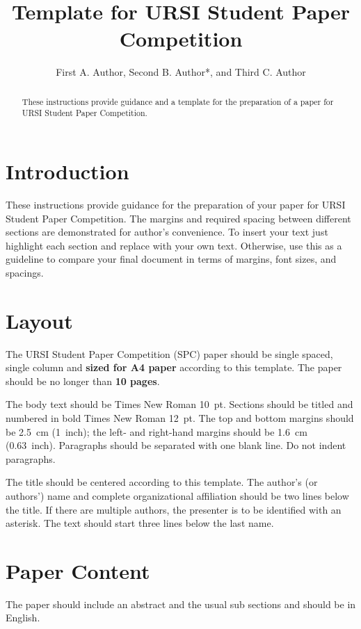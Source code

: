 \documentclass[spc]{ursi}
\title{Template for URSI Student Paper Competition}
\author{First A. Author\affref{ref1}, Second B. Author*\affref{ref1},
  and Third C. Author\affref{ref2}}
\affiliation{%
  \aff{ref1}{ABC University, Prague, Czechia; e-mail: FAA@seznam.cz; SBA@email.cz}
  \aff{ref2}{The Next University, Neverland, USA; e-mail: TCA@gmail.com}
}
\begin{document}
\maketitle

\begin{abstract}
  These instructions provide guidance and a template for
  the preparation of a paper for URSI Student Paper Competition.
\end{abstract}

\section{Introduction}

These instructions provide guidance for the preparation of your paper for URSI Student Paper Competition. The margins and required spacing between different
sections are demonstrated for author's convenience. To insert your text
just highlight each section and replace with your own text. Otherwise, use
this as a guideline to compare your final document in terms of margins,
font sizes, and spacings.

\section{Layout}

The URSI Student Paper Competition (SPC) paper should be single spaced,
single column and \textbf{sized for A4 paper} according to this
template. The paper should be no longer than \textbf{10 pages}.

The body text should be Times New Roman 10~pt. Sections should be titled
and numbered in bold Times New Roman 12~pt.  The top and bottom margins
should be 2.5~cm (1~inch); the left- and right-hand margins should be
1.6~cm (0.63~inch).  Paragraphs should be separated with one blank line. Do
not indent paragraphs.

The title should be centered according to this template. The author's (or
authors') name and complete organizational affiliation should be two lines
below the title. If there are multiple authors, the presenter is to be
identified with an asterisk.  The text should start three lines below the
last name.

\section{Paper Content}

The paper should include an abstract and the usual sub sections and should
be in English.
\end{document}
